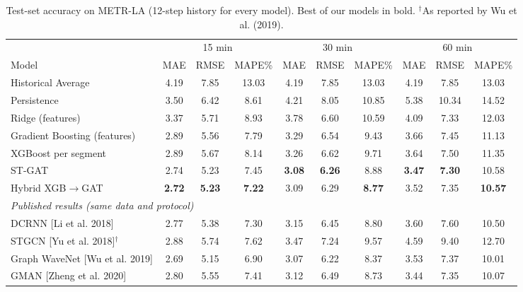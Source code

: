 \begin{table}[t]
\centering
\caption{Test-set accuracy on METR-LA (12-step history for every model). Best of our models in bold. $^\dagger$As reported by Wu et al. (2019).}
\label{tab:p2main}
\setlength{\tabcolsep}{3.5pt}
\begin{tabular}{lccccccccc}
\toprule
 & \multicolumn{3}{c}{15 min} & \multicolumn{3}{c}{30 min} & \multicolumn{3}{c}{60 min} \\ \cmidrule(lr){2-4} \cmidrule(lr){5-7} \cmidrule(lr){8-10}
Model & MAE & RMSE & MAPE\% & MAE & RMSE & MAPE\% & MAE & RMSE & MAPE\% \\
\midrule
Historical Average & 4.19 & 7.85 & 13.03 & 4.19 & 7.85 & 13.03 & 4.19 & 7.85 & 13.03 \\
Persistence & 3.50 & 6.42 & 8.61 & 4.21 & 8.05 & 10.85 & 5.38 & 10.34 & 14.52 \\
Ridge (features) & 3.37 & 5.71 & 8.93 & 3.78 & 6.60 & 10.59 & 4.09 & 7.33 & 12.03 \\
Gradient Boosting (features) & 2.89 & 5.56 & 7.79 & 3.29 & 6.54 & 9.43 & 3.66 & 7.45 & 11.13 \\
XGBoost per segment & 2.89 & 5.67 & 8.14 & 3.26 & 6.62 & 9.71 & 3.64 & 7.50 & 11.35 \\
ST-GAT & 2.74 & 5.23 & 7.45 & \textbf{3.08} & \textbf{6.26} & 8.88 & \textbf{3.47} & \textbf{7.30} & 10.58 \\
Hybrid XGB$\to$GAT & \textbf{2.72} & \textbf{5.23} & \textbf{7.22} & 3.09 & 6.29 & \textbf{8.77} & 3.52 & 7.35 & \textbf{10.57} \\
\midrule
\multicolumn{10}{l}{\emph{Published results (same data and protocol)}} \\
DCRNN [Li et al. 2018] & 2.77 & 5.38 & 7.30 & 3.15 & 6.45 & 8.80 & 3.60 & 7.60 & 10.50 \\
STGCN [Yu et al. 2018]$^\dagger$ & 2.88 & 5.74 & 7.62 & 3.47 & 7.24 & 9.57 & 4.59 & 9.40 & 12.70 \\
Graph WaveNet [Wu et al. 2019] & 2.69 & 5.15 & 6.90 & 3.07 & 6.22 & 8.37 & 3.53 & 7.37 & 10.01 \\
GMAN [Zheng et al. 2020] & 2.80 & 5.55 & 7.41 & 3.12 & 6.49 & 8.73 & 3.44 & 7.35 & 10.07 \\
\bottomrule
\end{tabular}
\end{table}